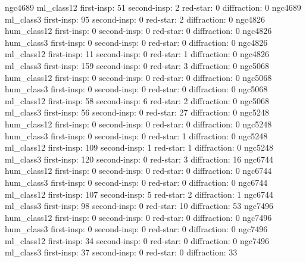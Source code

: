 ngc4689 ml_class12 first-insp: 51 second-insp:  2 red-star:  0 diffraction:  0
ngc4689 ml_class3 first-insp: 95 second-insp:  0 red-star:  2 diffraction:  0
ngc4826 hum_class12 first-insp: 0 second-insp:  0 red-star:  0 diffraction:  0
ngc4826 hum_class3 first-insp: 0 second-insp:  0 red-star:  0 diffraction:  0
ngc4826 ml_class12 first-insp: 11 second-insp:  0 red-star:  1 diffraction:  0
ngc4826 ml_class3 first-insp: 159 second-insp:  0 red-star:  3 diffraction:  0
ngc5068 hum_class12 first-insp: 0 second-insp:  0 red-star:  0 diffraction:  0
ngc5068 hum_class3 first-insp: 0 second-insp:  0 red-star:  0 diffraction:  0
ngc5068 ml_class12 first-insp: 58 second-insp:  6 red-star:  2 diffraction:  0
ngc5068 ml_class3 first-insp: 56 second-insp:  0 red-star:  27 diffraction:  0
ngc5248 hum_class12 first-insp: 0 second-insp:  0 red-star:  0 diffraction:  0
ngc5248 hum_class3 first-insp: 0 second-insp:  0 red-star:  1 diffraction:  0
ngc5248 ml_class12 first-insp: 109 second-insp:  1 red-star:  1 diffraction:  0
ngc5248 ml_class3 first-insp: 120 second-insp:  0 red-star:  3 diffraction:  16
ngc6744 hum_class12 first-insp: 0 second-insp:  0 red-star:  0 diffraction:  0
ngc6744 hum_class3 first-insp: 0 second-insp:  0 red-star:  0 diffraction:  0
ngc6744 ml_class12 first-insp: 107 second-insp:  5 red-star:  2 diffraction:  1
ngc6744 ml_class3 first-insp: 98 second-insp:  0 red-star:  10 diffraction:  53
ngc7496 hum_class12 first-insp: 0 second-insp:  0 red-star:  0 diffraction:  0
ngc7496 hum_class3 first-insp: 0 second-insp:  0 red-star:  0 diffraction:  0
ngc7496 ml_class12 first-insp: 34 second-insp:  0 red-star:  0 diffraction:  0
ngc7496 ml_class3 first-insp: 37 second-insp:  0 red-star:  0 diffraction:  33






